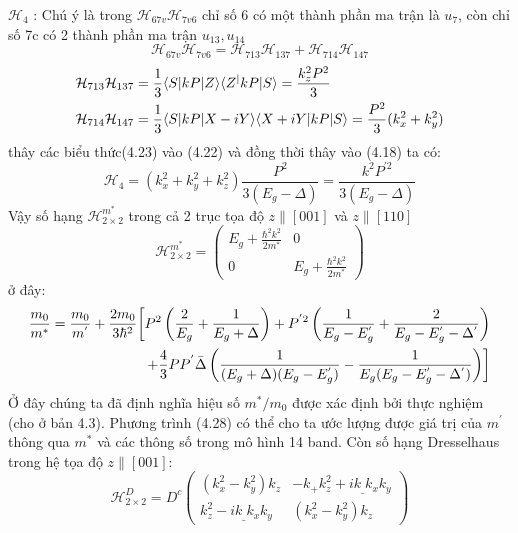 $\mathcal{H}_4$ : Chú ý là trong $\mathcal{H}_{67v}\mathcal{H}_{7v6}$ chỉ số 6 có một thành phần ma trận là $u_7$, còn chỉ số 7c có 2 thành phần ma trận $u_{13},u_{14}$
\begin{equation}
\mathcal{H}_{67v}\mathcal{H}_{7v6}=\mathcal{H}_{713}\mathcal{H}_{137} +\mathcal{H}_{714}\mathcal{H}_{147}
\end{equation}
\begin{align}
\mathcal{H}_{713}\mathcal{H}_{137}&=\frac{1}{3}\langle S|kP|Z\rangle\langle Z^|kP|S\rangle = \frac{k_z^2P^{2}}{3}\notag \\
\mathcal{H}_{714}\mathcal{H}_{147}&=\frac{1}{3}\langle S|kP|X-iY\rangle\langle X+iY|kP|S\rangle = \frac{P^{2}}{3}(k_x^2  +k_y^2)
\end{align}
thây các biểu thức(4.23) vào (4.22) và đồng thời thây vào (4.18) ta có:
\begin{equation}
\mathcal{H}_{4} =\left( k_x^2 + k_y^2 + k_z^2\right)\frac{P^{2}}{3(E_g -\Delta)} = \frac{k^2P^{'2}}{3(E_g -\Delta)}
\end{equation}
Vậy số hạng $\mathcal{H}_{2\times2}^{m^{*}}$ trong cả 2 trục tọa độ $z\parallel
[001]$ và $z\parallel[110]$
\begin{equation}
\mathcal{H}_{2\times2}^{m^{*}}=\begin{pmatrix}
E_g +\frac{\hbar^2 k^2}{2m^{*}} &0\\
0 & E_g +\frac{\hbar^2 k^2}{2m^{*}}
\end{pmatrix}
\end{equation}
ở đây:
\begin{align}
\frac{m_0}{m^{*}} =\frac{m_0}{m^{'}} +\frac{2m_0}{3\hbar^2}\biggl[ P^2\left(\frac{2}{E_g} +\frac{1}{E_g +\Delta}\right) + P^{'2}\left(\frac{1}{E_g -E_g^{'}} +\frac{2}{E_g -E_g^{'}-\Delta^{'}}\right) \notag\\
+\frac{4}{3}PP^{'}\bar{\Delta}\left(\frac{1}{(E_g +\Delta)(E_g -E_g^{'})} -\frac{1}{E_g(E_g -E_g^{'} -\Delta^{'})}\right)\biggr]
\end{align}
Ở đây chúng ta đã định nghĩa hiệu số $m^{*}/m_0$  được xác định bởi thực nghiệm (cho ở bản 4.3). Phương trình (4.28) có thể cho ta ước lượng được giá trị của $m^{'}$ thông qua $m^{*}$ và các thông số trong mô hình 14 band.
Còn số hạng Dresselhaus trong hệ tọa độ $z\parallel[001]$:
\begin{equation}
\mathcal{H}_{2\times2}^{D} = D^{c}\begin{pmatrix}
(k_x^2 -k_y^2)k_z &-k_+ k_z^2 +ik_\_ k_xk_y\\
k_z^2 -ik_\_ k_xk_y &(k_x^2 -k_y^2)k_z
\end{pmatrix}
\end{equation}
